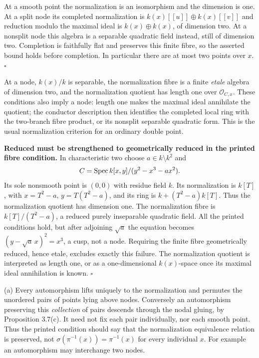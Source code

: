 \documentclass[11pt]{article}
\let\chapterexercise\exercise
\renewcommand{\exercise}[2]{\Needspace{8\baselineskip}\chapterexercise{#1}{#2}}
\begin{document}
\pf At a smooth point the normalization is an isomorphism and the dimension is one. At a split node its completed normalization is $k(x)[[u]]\oplus k(x)[[v]]$ and reduction modulo the maximal ideal is $k(x)\oplus k(x)$, of dimension two. At a nonsplit node this algebra is a separable quadratic field instead, still of dimension two. Completion is faithfully flat and preserves this finite fibre, so the asserted bound holds before completion. In particular there are at most two points over $x$. \hfill$\square$

\pf At a node, $k(x)/k$ is separable, the normalization fibre is a finite \emph{etale} algebra of dimension two, and the normalization quotient has length one over $\mathcal O_{C,x}$. These conditions also imply a node: length one makes the maximal ideal annihilate the quotient; the conductor description then identifies the completed local ring with the two-branch fibre product, or its nonsplit separable quadratic form. This is the usual normalization criterion for an ordinary double point.

\textbf{Reduced must be strengthened to geometrically reduced in the printed fibre condition.} In characteristic two choose $a\in k\setminus k^2$ and
\[ C=\operatorname{Spec} k[x,y]/(y^2-x^3-ax^2). \]
Its sole nonsmooth point is $(0,0)$ with residue field $k$. Its normalization is $k[T]$, with $x=T^2-a$, $y=T(T^2-a)$, and its ring is $k+(T^2-a)k[T]$. Thus the normalization quotient has dimension one. The normalization fibre is $k[T]/(T^2-a)$, a reduced purely inseparable quadratic field. All the printed conditions hold, but after adjoining $\sqrt a$ the equation becomes $(y-\sqrt a\,x)^2=x^3$, a cusp, not a node. Requiring the finite fibre geometrically reduced, hence etale, excludes exactly this failure. The normalization quotient is interpreted as length one, or as a one-dimensional $k(x)$-space once its maximal ideal annihilation is known. \hfill$\square$

\pf (a) Every automorphism lifts uniquely to the normalization and permutes the unordered pairs of points lying above nodes. Conversely an automorphism preserving this \emph{collection} of pairs descends through the nodal gluing, by Proposition 3.7(c). It need not fix each pair individually, nor each smooth point. Thus the printed condition should say that the normalization equivalence relation is preserved, not $\sigma(\pi^{-1}(x))=\pi^{-1}(x)$ for every individual $x$. For example an automorphism may interchange two nodes.
\end{document}

